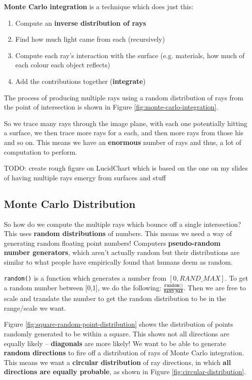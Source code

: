 \documentclass{article}
\begin{document}
\textbf{Monte Carlo integration} is a technique which does just this:
\begin{enumerate}
	\item Compute an \textbf{inverse distribution of rays}
	\item Find how much light came from each (recursively)
	\item Compute each ray's interaction with the surface (e.g. materials, how much of each colour each object reflects)
	\item Add the contributions together (\textbf{integrate})
\end{enumerate}
The process of producing multiple rays using a random distribution of rays from the point of intersection is shown in Figure \ref{fig:monte-carlo-integration}.

So we trace many rays through the image plane, with each one potentially hitting a surface, we then trace more rays for a each, and then more rays from those his and so on. This means we have an \textbf{enormous} number of rays and thus, a lot of computation to perform.

TODO: create rough figure on LucidChart which is based on the one on my slides of having multiple rays emergy from surfaces and stuff

\subsection{Monte Carlo Distribution}

So how do we compute the multiple rays which bounce off a single intersection? This uses \textbf{random distributions} of numbers. This means we need a way of generating random floating point numbers! Computers \textbf{pseudo-random number generators}, which aren't actually random but their distributions are similar to what people have empirically found that humans deem as random.

\texttt{random()} is a function which generates a number from $[0, RAND\_MAX]$. To get a random number between [0,1], we do the following: $\frac{\texttt{random()}}{\texttt{RAND\_MAX}}$. Then we are free to scale and translate the number to get the random distribution to be in the range/scale we want.

Figure \ref{fig:square-random-point-distribution} shows the distribution of points randomly generated to be within a square. This shows not all directions are equally likely -- \textbf{diagonals} are more likely! We want to be able to generate \textbf{random directions} to fire off a distribution of rays of Monte Carlo integration. This means we want a \textbf{circular distribution} of ray directions, in which \textbf{all directions are equally probable}, as shown in Figure \ref{fig:circular-distribution}.
\end{document}
